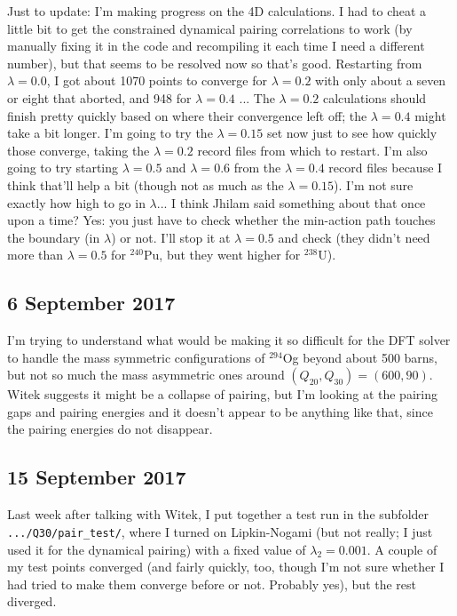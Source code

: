 Just to update: I'm making progress on the 4D calculations. I had to cheat a little bit to get the constrained dynamical pairing correlations to work (by manually fixing it in the code and recompiling it each time I need a different number), but that seems to be resolved now so that's good. Restarting from $\lambda=0.0$, I got about 1070 points to converge for $\lambda=0.2$ with only about a seven or eight that aborted, and 948 for $\lambda=0.4$ ... The $\lambda=0.2$ calculations should finish pretty quickly based on where their convergence left off; the $\lambda=0.4$ might take a bit longer. I'm going to try the $\lambda=0.15$ set now just to see how quickly those converge, taking the $\lambda=0.2$ record files from which to restart. I'm also going to try starting $\lambda=0.5$ and $\lambda=0.6$ from the $\lambda=0.4$ record files because I think that'll help a bit (though not as much as the $\lambda=0.15$). I'm not sure exactly how high to go in $\lambda$... I think Jhilam said something about that once upon a time? Yes: you just have to check whether the min-action path touches the boundary (in $\lambda$) or not. I'll stop it at $\lambda=0.5$ and check (they didn't need more than $\lambda=0.5$ for $^{240}$Pu, but they went higher for $^{238}$U).

\subsection*{6 September 2017}
I'm trying to understand what would be making it so difficult for the DFT solver to handle the mass symmetric configurations of $^{294}$Og beyond about 500 barns, but not so much the mass asymmetric ones around $(Q_{20},Q_{30})=(600, 90)$. Witek suggests it might be a collapse of pairing, but I'm looking at the pairing gaps and pairing energies and it doesn't appear to be anything like that, since the pairing energies do not disappear. 

\subsection*{15 September 2017}
Last week after talking with Witek, I put together a test run in the subfolder \texttt{.../Q30/pair\_test/}, where I turned on Lipkin-Nogami (but not really; I just used it for the dynamical pairing) with a fixed value of $\lambda_2=0.001$. A couple of my test points converged (and fairly quickly, too, though I'm not sure whether I had tried to make them converge before or not. Probably yes), but the rest diverged.


